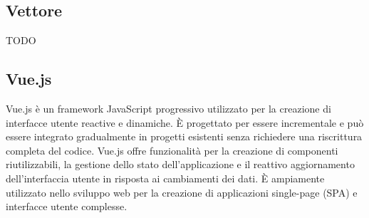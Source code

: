 \vspace{2em}
\subsection*{Vettore}
TODO

\vspace{2em}
\subsection*{Vue.js}
Vue.js è un framework JavaScript progressivo utilizzato per la creazione di interfacce utente reactive e dinamiche. È progettato per essere incrementale e può essere integrato gradualmente in progetti esistenti senza richiedere una riscrittura completa del codice. Vue.js offre funzionalità per la creazione di componenti riutilizzabili, la gestione dello stato dell'applicazione e il reattivo aggiornamento dell'interfaccia utente in risposta ai cambiamenti dei dati. È ampiamente utilizzato nello sviluppo web per la creazione di applicazioni single-page (SPA) e interfacce utente complesse.
